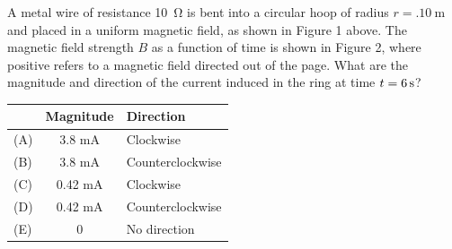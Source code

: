 \documentclass{../../../oss-apphys-exam}
\begin{document}
\begin{questions}

  \question A metal wire of resistance \SI{10}{\ohm} is bent into a circular
  hoop of radius $r=\SI{.10}\metre$ and placed in a uniform magnetic field, as
  shown in Figure 1 above. The magnetic field strength $B$ as a function of time
  is shown in Figure 2, where positive refers to a magnetic field directed out
  of the page. What are the magnitude and direction of the current induced in
  the ring at time $t=\SI6\second$?
  
  \begin{tabular}{lcl}
    & \textbf{Magnitude} & \textbf{Direction}\\\hline
    (A)  & 3.8 mA  & Clockwise \\
    (B)  & 3.8 mA  & Counterclockwise \\
    (C)  & 0.42 mA & Clockwise \\
    (D)  & 0.42 mA & Counterclockwise \\
    (E)  & 0       & No direction
  \end{tabular}
  
  \newpage
  


\end{questions}
\end{document}
